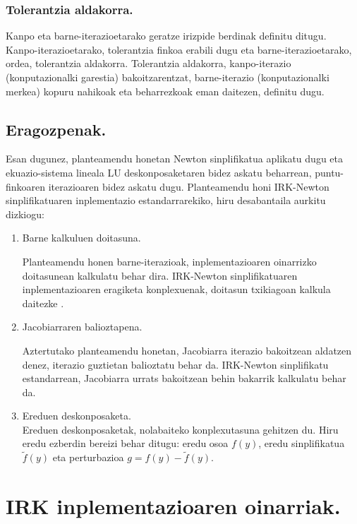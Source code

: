 \subsubsection*{Tolerantzia aldakorra.}

Kanpo eta barne-iterazioetarako geratze irizpide berdinak definitu ditugu. Kanpo-iterazioetarako, tolerantzia finkoa erabili dugu eta barne-iterazioetarako, ordea, tolerantzia aldakorra. Tolerantzia aldakorra, kanpo-iterazio (konputazionalki garestia) bakoitzarentzat, barne-iterazio (konputazionalki merkea) kopuru nahikoak eta beharrezkoak eman daitezen, definitu dugu.     
 

\subsection*{Eragozpenak.}
Esan dugunez, planteamendu honetan Newton sinplifikatua aplikatu dugu eta ekuazio-sistema lineala LU deskonposaketaren bidez askatu beharrean, puntu-finkoaren iterazioaren bidez askatu dugu. Planteamendu honi IRK-Newton sinplifikatuaren inplementazio estandarrarekiko, hiru desabantaila aurkitu dizkiogu: 
\begin{enumerate}
\item Barne kalkuluen doitasuna. 

Planteamendu honen barne-iterazioak, inplementazioaren oinarrizko doitasunean kalkulatu behar dira.
IRK-Newton sinplifikatuaren inplementazioaren eragiketa konplexuenak, doitasun txikiagoan kalkula daitezke \cite{Baboulin20092526}. 

\item Jacobiarraren balioztapena.

Aztertutako planteamendu honetan, Jacobiarra iterazio bakoitzean aldatzen denez, iterazio guztietan balioztatu behar da.
IRK-Newton sinplifikatu estandarrean, Jacobiarra urrats bakoitzean behin bakarrik kalkulatu behar da. 

\item Ereduen deskonposaketa.\\
Ereduen deskonposaketak, nolabaiteko konplexutasuna gehitzen du. Hiru eredu ezberdin bereizi behar ditugu: eredu osoa $f(y)$, eredu sinplifikatua $\tilde{f}(y)$ eta perturbazioa  $g=f(y)-\tilde{f}(y)$. 
\end{enumerate}

\section{IRK inplementazioaren oinarriak.}


